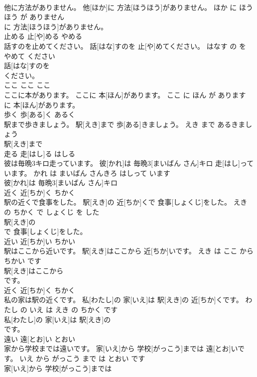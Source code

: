 \documentclass[8pt]{extreport}
\begin{document}
\begin{CJK}{UTF8}{min}
\\	他に方法がありません。	他[ほか]に 方法[ほうほう]がありません。	ほか に ほうほう が ありません	
\\	に 方法[ほうほう]がありません。		
\\	止める	止[や]める	やめる	
\\	話すのを止めてください。	話[はな]すのを 止[や]めてください。	はなす の を やめて ください	
\\	話[はな]すのを
\\	ください。		
\\	ここ	ここ	ここ	
\\	ここに本があります。	ここに 本[ほん]があります。	ここ に ほん が あります	
\\	に 本[ほん]があります。		
\\	歩く	歩[ある]く	あるく	
\\	駅まで歩きましょう。	駅[えき]まで 歩[ある]きましょう。	えき まで あるきましょう	
\\	駅[えき]まで
\\	走る	走[はし]る	はしる	
\\	彼は毎晩3キロ走っています。	彼[かれ]は 毎晩3[まいばん さん]キロ 走[はし]っています。	かれ は まいばん さんきろ はしって います	
\\	彼[かれ]は 毎晩3[まいばん さん]キロ
\\	近く	近[ちか]く	ちかく	
\\	駅の近くで食事をした。	駅[えき]の 近[ちか]くで 食事[しょくじ]をした。	えき の ちかく で しょくじ を した	
\\	駅[えき]の
\\	で 食事[しょくじ]をした。		
\\	近い	近[ちか]い	ちかい	
\\	駅はここから近いです。	駅[えき]はここから 近[ちか]いです。	えき は ここ から ちかい です	
\\	駅[えき]はここから
\\	です。		
\\	近く	近[ちか]く	ちかく	
\\	私の家は駅の近くです。	私[わたし]の 家[いえ]は 駅[えき]の 近[ちか]くです。	わたし の いえ は えき の ちかく です	
\\	私[わたし]の 家[いえ]は 駅[えき]の
\\	です。		
\\	遠い	遠[とお]い	とおい	
\\	家から学校までは遠いです。	家[いえ]から 学校[がっこう]までは 遠[とお]いです。	いえ から がっこう まで は とおい です	
\\	家[いえ]から 学校[がっこう]までは

\end{CJK}
\end{document}
